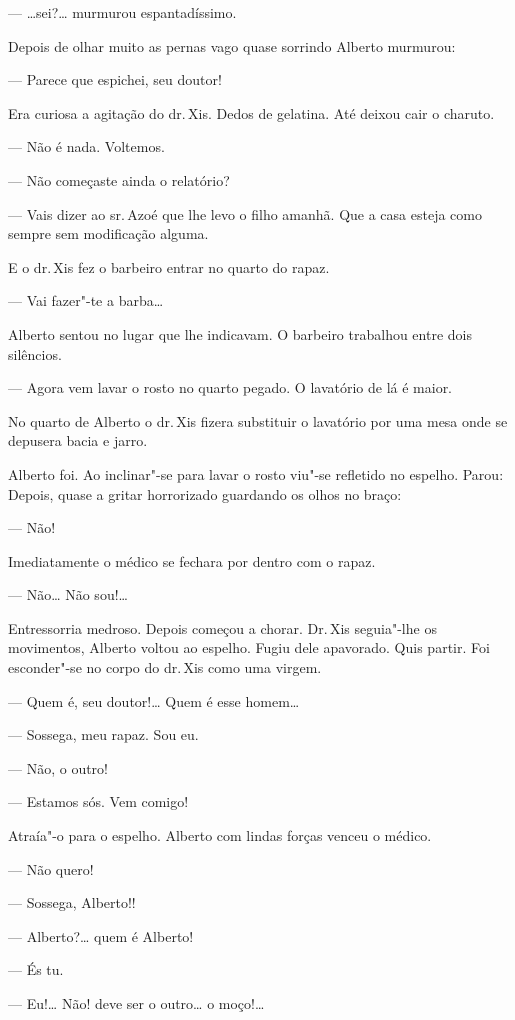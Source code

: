 \begin{linenumbers}
--- \ldots{}sei?\ldots{} murmurou espantadíssimo.

Depois de olhar muito as pernas vago quase sorrindo Alberto murmurou:

--- Parece que espichei, seu doutor!

Era curiosa a agitação do dr.\,Xis. Dedos de gelatina. Até deixou cair o
charuto.

--- Não é nada. Voltemos.

--- Não começaste ainda o relatório?

--- Vais dizer ao sr.\,Azoé que lhe levo o filho amanhã. Que a casa
esteja como sempre sem modificação alguma.

E o dr.\,Xis fez o barbeiro entrar no quarto do rapaz.

--- Vai fazer"-te a barba\ldots{}

Alberto sentou no lugar que lhe indicavam. O barbeiro trabalhou entre
dois silêncios.

--- Agora vem lavar o rosto no quarto pegado. O lavatório de lá é maior.

No quarto de Alberto o dr.\,Xis fizera substituir o lavatório por uma
mesa onde se depusera bacia e jarro.

Alberto foi. Ao inclinar"-se para lavar o rosto viu"-se refletido no
espelho. Parou: Depois, quase a gritar horrorizado guardando os olhos no
braço:

--- Não!

Imediatamente o médico se fechara por dentro com o rapaz.

--- Não\ldots{} Não sou!\ldots{}

Entressorria medroso. Depois começou a chorar. Dr.\,Xis seguia"-lhe os
movimentos, Alberto voltou ao espelho. Fugiu dele apavorado. Quis
partir. Foi esconder"-se no corpo do dr.\,Xis como uma virgem.

--- Quem é, seu doutor!\ldots{} Quem é esse homem\ldots{}

--- Sossega, meu rapaz. Sou eu.

--- Não, o outro!

--- Estamos sós. Vem comigo!

Atraía"-o para o espelho. Alberto com lindas forças venceu o médico.

--- Não quero!

--- Sossega, Alberto!!

--- Alberto?\ldots{} quem é Alberto!

--- És tu.

--- Eu!\ldots{} Não! deve ser o outro\ldots{} o moço!\ldots{}


\end{linenumbers}
